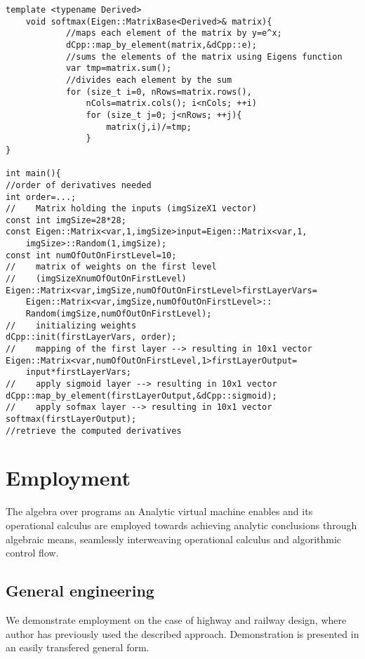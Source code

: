 \documentclass{article}
\begin{document}
\begin{lstlisting}
template <typename Derived>
    void softmax(Eigen::MatrixBase<Derived>& matrix){
            //maps each element of the matrix by y=e^x;
            dCpp::map_by_element(matrix,&dCpp::e);
            //sums the elements of the matrix using Eigens function
            var tmp=matrix.sum();
            //divides each element by the sum
            for (size_t i=0, nRows=matrix.rows(), 
            	nCols=matrix.cols(); i<nCols; ++i)
                for (size_t j=0; j<nRows; ++j){
                    matrix(j,i)/=tmp;
                }
}

int main(){
//order of derivatives needed
int order=...;
//    Matrix holding the inputs (imgSizeX1 vector)
const int imgSize=28*28;
const Eigen::Matrix<var,1,imgSize>input=Eigen::Matrix<var,1,
	imgSize>::Random(1,imgSize);
const int numOfOutOnFirstLevel=10;
//    matrix of weights on the first level 
//    (imgSizeXnumOfOutOnFirstLevel)
Eigen::Matrix<var,imgSize,numOfOutOnFirstLevel>firstLayerVars=
	Eigen::Matrix<var,imgSize,numOfOutOnFirstLevel>::
	Random(imgSize,numOfOutOnFirstLevel);
//    initializing weights
dCpp::init(firstLayerVars, order);
//    mapping of the first layer --> resulting in 10x1 vector
Eigen::Matrix<var,numOfOutOnFirstLevel,1>firstLayerOutput=
	input*firstLayerVars;
//    apply sigmoid layer --> resulting in 10x1 vector
dCpp::map_by_element(firstLayerOutput,&dCpp::sigmoid);
//    apply sofmax layer --> resulting in 10x1 vector
softmax(firstLayerOutput);
//retrieve the computed derivatives
\end{lstlisting}

\section{Employment}\label{sec:Employment}

The algebra over programs \cite[Theorem~5.3]{OperationalCalculus} an Analytic virtual machine enables and its operational calculus are employed towards achieving analytic conclusions through algebraic means, seamlessly interweaving operational calculus and algorithmic control flow. 

\subsection{General engineering}\label{sec:generalEngineering}

We demonstrate employment on the case of highway and railway design, where author has previously used the described approach. Demonstration is presented in an easily transfered general form.
\end{document}
